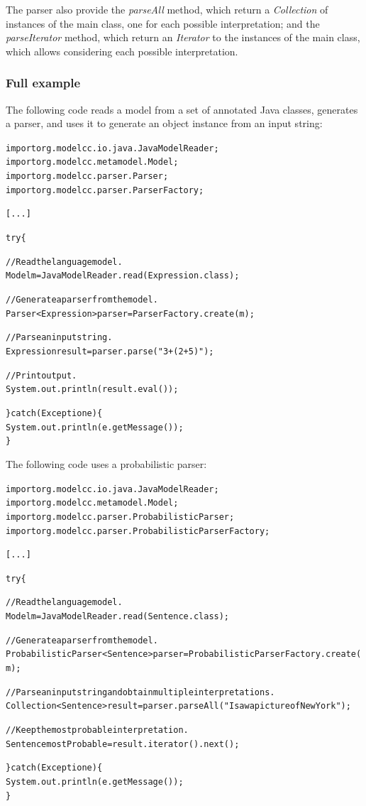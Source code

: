 \documentclass[a4paper,twoside,onecolumn]{article}
\newenvironment{colframe}{%
  \begin{Sbox} 
    \begin{minipage}{.8\columnwidth} 
}{%

  \end{minipage} 
  \end{Sbox} 
  \begin{center} 
    \fcolorbox{black}{MyGray}{\TheSbox} 
  \end{center} 
}
\begin{document}
The parser also provide the \emph{parseAll} method, which return a \emph{Collection} of instances of the main class, one for each possible interpretation; and the \emph{parseIterator} method, which return an \emph{Iterator} to the instances of the main class, which allows considering each possible interpretation.

\subsubsection{Full example} \label{sec:fullexample}

The following code reads a model from a set of annotated Java classes, generates a parser, and uses it to generate an object instance from an input string:

\begin{colframe}
\begin{alltt}
import org.modelcc.io.java.JavaModelReader;
import org.modelcc.metamodel.Model;
import org.modelcc.parser.Parser;
import org.modelcc.parser.ParserFactory;

[...]

try \{

  // Read the language model.
  Model m = JavaModelReader.read(Expression.class);

  // Generate a parser from the model.
  Parser<Expression> parser = ParserFactory.create(m);

  // Parse an input string.
  Expression result = parser.parse("3+(2+5)");

  // Print output.
  System.out.println(result.eval());

\} catch (Exception e) \{
  System.out.println(e.getMessage());
\}
\end{alltt}
\end{colframe}

The following code uses a probabilistic parser:

\begin{colframe}
\begin{alltt}
import org.modelcc.io.java.JavaModelReader;
import org.modelcc.metamodel.Model;
import org.modelcc.parser.ProbabilisticParser;
import org.modelcc.parser.ProbabilisticParserFactory;

[...]

try \{

  // Read the language model.
  Model m = JavaModelReader.read(Sentence.class);

  // Generate a parser from the model.
  ProbabilisticParser<Sentence> parser = ProbabilisticParserFactory.create(m);

  // Parse an input string and obtain multiple interpretations.
  Collection<Sentence> result = parser.parseAll("I saw a picture of New York");

  // Keep the most probable interpretation.
  Sentence mostProbable = result.iterator().next();

\} catch (Exception e) \{
  System.out.println(e.getMessage());
\}
\end{alltt}
\end{colframe}
\end{document}
